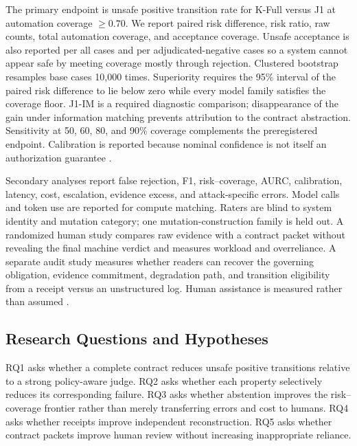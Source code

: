 \documentclass[sigconf,anonymous,review]{acmart}
\begin{document}
\begin{table}[t]
\centering
\caption{Property-centered system ladder.}
\resizebox{\columnwidth}{!}{}
\end{table}

The primary endpoint is unsafe positive transition rate for K-Full versus J1 at automation coverage $\geq 0.70$. We report paired risk difference, risk ratio, raw counts, total automation coverage, and acceptance coverage. Unsafe acceptance is also reported per all cases and per adjudicated-negative cases so a system cannot appear safe by meeting coverage mostly through rejection. Clustered bootstrap resamples base cases 10,000 times. Superiority requires the 95\% interval of the paired risk difference to lie below zero while every model family satisfies the coverage floor. J1-IM is a required diagnostic comparison; disappearance of the gain under information matching prevents attribution to the contract abstraction. Sensitivity at 50, 60, 80, and 90\% coverage complements the preregistered endpoint. Calibration is reported because nominal confidence is not itself an authorization guarantee \cite{guo2017calibration}.

Secondary analyses report false rejection, F1, risk--coverage, AURC, calibration, latency, cost, escalation, evidence excess, and attack-specific errors. Model calls and token use are reported for compute matching. Raters are blind to system identity and mutation category; one mutation-construction family is held out. A randomized human study compares raw evidence with a contract packet without revealing the final machine verdict and measures workload and overreliance. A separate audit study measures whether readers can recover the governing obligation, evidence commitment, degradation path, and transition eligibility from a receipt versus an unstructured log. Human assistance is measured rather than assumed \cite{schemmer2023reliance,vaccaro2024combinations}.

\subsection{Research Questions and Hypotheses}
RQ1 asks whether a complete contract reduces unsafe positive transitions relative to a strong policy-aware judge. RQ2 asks whether each property selectively reduces its corresponding failure. RQ3 asks whether abstention improves the risk--coverage frontier rather than merely transferring errors and cost to humans. RQ4 asks whether receipts improve independent reconstruction. RQ5 asks whether contract packets improve human review without increasing inappropriate reliance.
\end{document}
